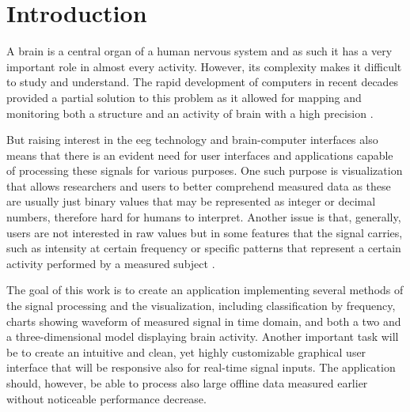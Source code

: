 

\glsunsetall

\chapter{Introduction}
A brain is a central organ of a human nervous system and as such it has a very
important role in almost every activity. However, its complexity makes it
difficult to study and understand. The rapid development of computers in recent
decades provided a partial solution to this problem as it allowed for mapping and
monitoring both a structure and an activity of brain with a high precision \cite{compForBrainStudy}.

But raising interest in the \gls{eeg} technology and brain-computer interfaces also means
that there is an evident need for user interfaces and applications capable of
processing these signals for various purposes. One such purpose is visualization
that allows researchers and users to better comprehend measured data as these
are usually just binary values that may be represented as integer or decimal
numbers, therefore hard for humans to interpret. Another issue is that,
generally, users are not interested in raw values but in some features that the
signal carries, such as intensity at certain frequency or specific patterns that
represent a certain activity performed by a measured subject \cite{eegWaveFt}.

The goal of this work is to create an application implementing several
methods of the signal processing and the visualization, including classification by
frequency, charts showing waveform of measured signal in time domain, and both
a two and a three-dimensional model displaying brain activity. Another important
task will be to create an intuitive and clean, yet highly customizable graphical
user interface that will be responsive also for real-time signal inputs. The
application should, however, be able to process also large offline data measured
earlier without noticeable performance decrease.

